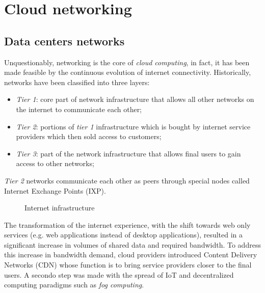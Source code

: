 \chapter{Cloud networking}
\section{Data centers networks}
Unquestionably, networking is the core of \emph{cloud computing}, in fact, it
has been made feasible by the continuous evolution of internet connectivity.
Historically, networks have been classified into three layers:
\begin{itemize}
    \item \emph{Tier 1}: core part of network infrastructure that allows all
    other networks on the internet to communicate each other;
    \item \emph{Tier 2}: portions of \emph{tier 1} infrastructure which is
    bought by internet service providers which then sold access to customers;
    \item \emph{Tier 3}: part of the network infrastructure that allows final
    users to gain access to other networks;
\end{itemize}
\begin{note}
    \emph{Tier 2} networks communicate each other as peers through special nodes
    called Internet Exchange Points (IXP).
\end{note}

\begin{figure}[h!]
    \centering
    \caption{Internet infrastructure}
\end{figure}

\noindent
The transformation of the internet experience, with the shift towards web only
services (e.g. web applications instead of desktop applications), resulted in
a significant increase in volumes of shared data and required bandwidth. To
address this increase in bandwidth demand, cloud providers introduced Content
Delivery Networks (CDN) whose function is to bring service providers closer
to the final users. A secondo step was made with the spread of IoT and
decentralized computing paradigms such as \emph{fog computing}.

\begin{figure}[ht!]
    \centering
    \hfill
    \\
    \\
\end{figure}

